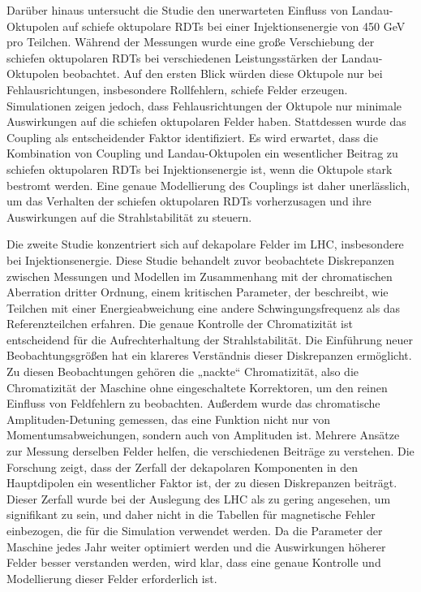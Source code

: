 {Darüber hinaus untersucht die Studie den unerwarteten Einfluss von Landau-Oktupolen auf schiefe oktupolare RDTs bei einer Injektionsenergie von 450 GeV pro Teilchen. Während der Messungen wurde eine große Verschiebung der schiefen oktupolaren RDTs bei verschiedenen Leistungsstärken der Landau-Oktupolen beobachtet. Auf den ersten Blick würden diese Oktupole nur bei Fehlausrichtungen, insbesondere Rollfehlern, schiefe Felder erzeugen. Simulationen zeigen jedoch, dass Fehlausrichtungen der Oktupole nur minimale Auswirkungen auf die schiefen oktupolaren Felder haben. Stattdessen wurde das Coupling als entscheidender Faktor identifiziert. Es wird erwartet, dass die Kombination von Coupling und Landau-Oktupolen ein wesentlicher Beitrag zu schiefen oktupolaren RDTs bei Injektionsenergie ist, wenn die Oktupole stark bestromt werden. Eine genaue Modellierung des Couplings ist daher unerlässlich, um das Verhalten der schiefen oktupolaren RDTs vorherzusagen und ihre Auswirkungen auf die Strahlstabilität zu steuern.

 Die zweite Studie konzentriert sich auf dekapolare Felder im LHC, insbesondere bei Injektionsenergie. Diese Studie behandelt zuvor beobachtete Diskrepanzen zwischen Messungen und Modellen im Zusammenhang mit der chromatischen Aberration dritter Ordnung, einem kritischen Parameter, der beschreibt, wie Teilchen mit einer Energieabweichung eine andere Schwingungsfrequenz als das Referenzteilchen erfahren. Die genaue Kontrolle der Chromatizität ist entscheidend für die Aufrechterhaltung der Strahlstabilität. Die Einführung neuer Beobachtungsgrößen hat ein klareres Verständnis dieser Diskrepanzen ermöglicht. Zu diesen Beobachtungen gehören die „nackte“ Chromatizität, also die Chromatizität der Maschine ohne eingeschaltete Korrektoren, um den reinen Einfluss von Feldfehlern zu beobachten. Außerdem wurde das chromatische Amplituden-Detuning gemessen, das eine Funktion nicht nur von Momentumsabweichungen, sondern auch von Amplituden ist. Mehrere Ansätze zur Messung derselben Felder helfen, die verschiedenen Beiträge zu verstehen. Die Forschung zeigt, dass der Zerfall der dekapolaren Komponenten in den Hauptdipolen ein wesentlicher Faktor ist, der zu diesen Diskrepanzen beiträgt. Dieser Zerfall wurde bei der Auslegung des LHC als zu gering angesehen, um signifikant zu sein, und daher nicht in die Tabellen für magnetische Fehler einbezogen, die für die Simulation verwendet werden. Da die Parameter der Maschine jedes Jahr weiter optimiert werden und die Auswirkungen höherer Felder besser verstanden werden, wird klar, dass eine genaue Kontrolle und Modellierung dieser Felder erforderlich ist.

}
